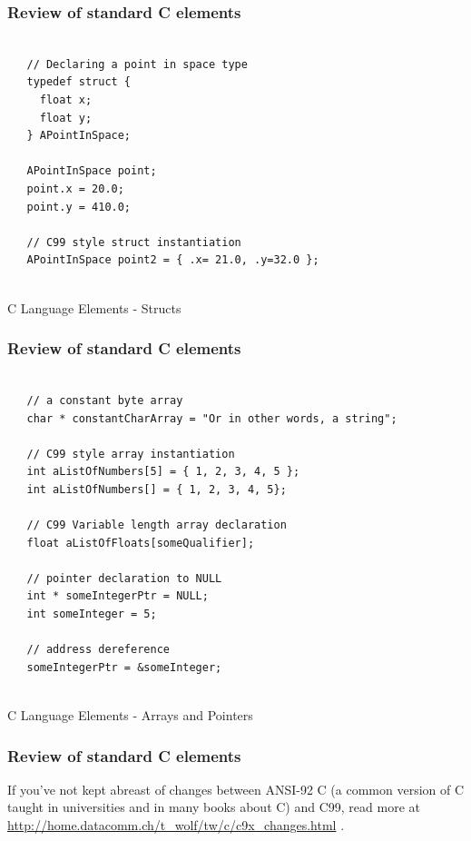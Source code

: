 \documentclass[10pt]{beamer}
\begin{document}
\begin{frame}[fragile]
  \frametitle{Review of standard C elements}
  \begin{listing}[H]
     \begin{verbatim}
   
   // Declaring a point in space type             
   typedef struct {
     float x;
     float y;
   } APointInSpace;
   
   APointInSpace point;
   point.x = 20.0;
   point.y = 410.0; 
   
   // C99 style struct instantiation              
   APointInSpace point2 = { .x= 21.0, .y=32.0 }; 
              
   \end{verbatim}
     \caption{C Language Elements - Structs}
     \label{listing:2}
   \end{listing}

\end{frame}

\begin{frame}[fragile]
  \frametitle{Review of standard C elements}
  \begin{listing}[H]
     \begin{verbatim}
   
   // a constant byte array             
   char * constantCharArray = "Or in other words, a string"; 
   
   // C99 style array instantiation
   int aListOfNumbers[5] = { 1, 2, 3, 4, 5 };
   int aListOfNumbers[] = { 1, 2, 3, 4, 5}; 
   
   // C99 Variable length array declaration
   float aListOfFloats[someQualifier];
   
   // pointer declaration to NULL              
   int * someIntegerPtr = NULL; 
   int someInteger = 5;
   
   // address dereference              
   someIntegerPtr = &someInteger; 
               
   \end{verbatim}
     \caption{C Language Elements - Arrays and Pointers}
     \label{listing:3}
   \end{listing}

\end{frame}

\begin{frame}[fragile]
  \frametitle{Review of standard C elements}
  If you've not kept abreast of changes between ANSI-92 C (a common version of C taught in universities and in many books about C) and C99, read more at \url{http://home.datacomm.ch/t_wolf/tw/c/c9x_changes.html} \cite{C99Changes}.

\end{frame}
\end{document}
